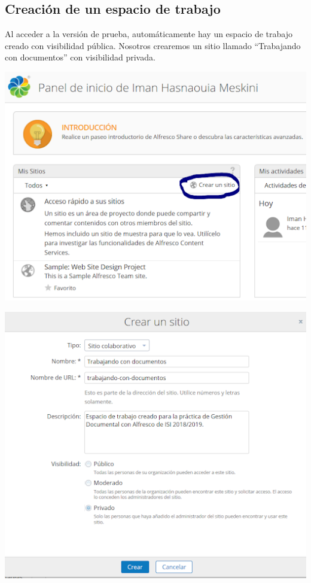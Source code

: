 \documentclass{article}
\begin{document}
\subsection{Creación de un espacio de trabajo}

Al acceder a la versión de prueba, automáticamente hay un espacio de trabajo creado con visibilidad pública. Nosotros crearemos un sitio llamado “Trabajando con documentos” con visibilidad privada.

\begin{center}
\includegraphics[scale=0.5]{images/workspace1.png}
\end{center}

\begin{center}
\includegraphics[scale=0.5]{images/workspace2.png}
\end{center}
\end{document}
